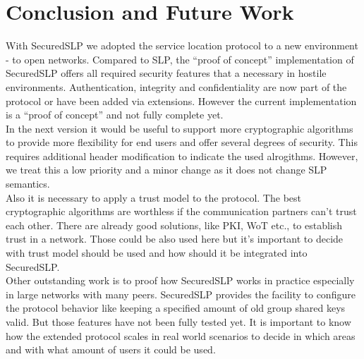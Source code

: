 \section{Conclusion and Future Work}
With SecuredSLP we adopted the service location protocol to a new environment - to open networks. Compared to SLP, the ``proof of concept'' implementation of SecuredSLP offers all required security features that a necessary in hostile environments. Authentication, integrity and confidentiality are now part of the protocol or have been added via extensions. However the current implementation is a ``proof of concept'' and not fully complete yet.\\
In the next version it would be useful to support more cryptographic algorithms to provide more flexibility for end users and offer several degrees of security. This requires additional header modification to indicate the used alrogithms. However, we treat this a low priority and a minor change as it does not change SLP semantics.\\
Also it is necessary to apply a trust model to the protocol. The best cryptographic algorithms are worthless if the communication partners can't trust each other. There are already good solutions, like PKI, WoT etc., to establish trust in a network. Those could be also used here but it's important to decide with trust model should be used and how should it be integrated into SecuredSLP.\\
Other outstanding work is to proof how SecuredSLP works in practice especially in large networks with many peers. SecuredSLP provides the facility to configure the protocol behavior like keeping a specified amount of old group shared keys valid. But those features have not been fully tested yet. It is important to know how the extended protocol scales in real world scenarios to decide in which areas and with what amount of users it could be used.